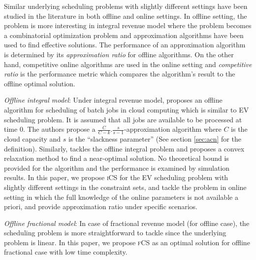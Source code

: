 \documentclass[journal]{IEEEtran}
\newcommand{\bt}[1]{{\color{blue}#1}}%
\newcommand{\bt}[1]{#1}
\newcommand{\ics}{\textsc{iCS}\xspace}
\newcommand{\fcs}{\textsc{fCS}\xspace}
\begin{document}
\bt{
	Similar underlying scheduling problems with slightly different settings have been studied in the literature in both offline and online settings. In offline setting, the problem is more interesting in integral revenue model where the problem becomes a combinatorial optimization problem and approximation algorithms have been used to find effective solutions. 
The performance of an approximation algorithm is determined by its \emph{approximation ratio} for offline 
algorithms. On the other hand, competitive online algorithms are used in the online setting and \emph{competitive ratio} is the performance metric which compares the algorithm's result to the offline optimal solution. 

\textit{Offline integral model}: Under integral revenue model, \cite{jain2015near} proposes an offline algorithm for scheduling of batch jobs in cloud computing which is similar to EV scheduling problem. It is assumed that all jobs are available to be processed at time 0. The authors propose a $\frac{C}{C-k}.\frac{s}{s-1}$-approximation algorithm where $C$ is the cloud capacity and $s$ is the ``slackness parameter'' (See section \ref{sec:acn} for the definition). 
Similarly, \cite{yao2016real} tackles the offline integral problem and proposes a convex relaxation method to find a near-optimal solution. No theoretical bound is provided for the algorithm and the performance is examined by simulation results. In this paper, we propose \ics for the EV scheduling problem with slightly different settings in the constraint sets, and tackle the problem in online setting in which the full knowledge of the online parameters is not available a priori, and provide approximation ratio under specific scenarios. 

\textit{Offline fractional model}: In case of fractional revenue model (for offline case), the scheduling problem is more straightforward to tackle since the underlying problem is linear. In this paper, we propose \fcs as an optimal solution for offline fractional case with low time complexity.

}
\end{document}
